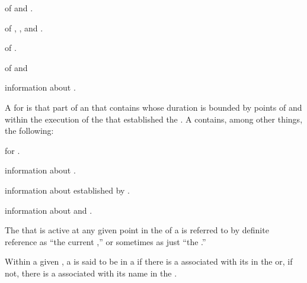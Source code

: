\beginlist
\item{\bull}  of  and .
\item{\bull}  of , , and .
\item{\bull}%
%
  of .
%
\item{\bull}  of  and  
\item{\bull} information about .
\endlist

\endsubsubsection%


A  for  is that part of an
 that contains  whose duration
is bounded by points of  and  
within the execution of the  that
established the .
A  contains, among other things, the following:

\beginlist
\item{\bull}  for .
\item{\bull} information about  .
\item{\bull} information about  established by .
\item{\bull} information about   and .
\endlist

The  that is active at any given point 
in the  of a  is referred to by 
definite reference as ``the current ,''
or sometimes as just ``the .''

Within a given ,
a  is said to be 
in a  if there is a  
associated with its  in the  
or, if not, there is a  
associated with its name in the .

\endsubsubsection%



